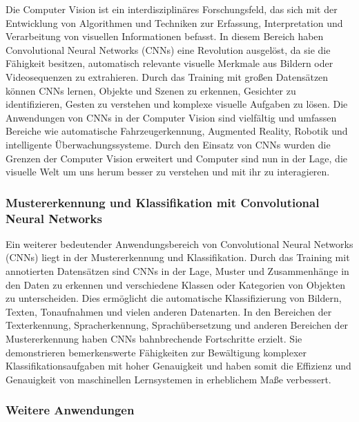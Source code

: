             Die Computer Vision ist ein interdisziplinäres Forschungsfeld, das sich mit der Entwicklung von Algorithmen und Techniken zur Erfassung, Interpretation und Verarbeitung von visuellen Informationen befasst. 
            In diesem Bereich haben Convolutional Neural Networks (CNNs) eine Revolution ausgelöst, da sie die Fähigkeit besitzen, automatisch relevante visuelle Merkmale aus Bildern oder Videosequenzen zu extrahieren. 
            Durch das Training mit großen Datensätzen können CNNs lernen, Objekte und Szenen zu erkennen, Gesichter zu identifizieren, Gesten zu verstehen und komplexe visuelle Aufgaben zu lösen. 
            Die Anwendungen von CNNs in der Computer Vision sind vielfältig und umfassen Bereiche wie automatische Fahrzeugerkennung, Augmented Reality, Robotik und intelligente Überwachungssysteme. 
            Durch den Einsatz von CNNs wurden die Grenzen der Computer Vision erweitert und Computer sind nun in der Lage, die visuelle Welt um uns herum besser zu verstehen und mit ihr zu interagieren.
        
        \subsubsection{Mustererkennung und Klassifikation mit Convolutional Neural Networks}
    
            Ein weiterer bedeutender Anwendungsbereich von Convolutional Neural Networks (CNNs) liegt in der Mustererkennung und Klassifikation. 
            Durch das Training mit annotierten Datensätzen sind CNNs in der Lage, Muster und Zusammenhänge in den Daten zu erkennen und verschiedene Klassen oder Kategorien von Objekten zu unterscheiden. 
            Dies ermöglicht die automatische Klassifizierung von Bildern, Texten, Tonaufnahmen und vielen anderen Datenarten. 
            In den Bereichen der Texterkennung, Spracherkennung, Sprachübersetzung und anderen Bereichen der Mustererkennung haben CNNs bahnbrechende Fortschritte erzielt. 
            Sie demonstrieren bemerkenswerte Fähigkeiten zur Bewältigung komplexer Klassifikationsaufgaben mit hoher Genauigkeit und haben somit die Effizienz und Genauigkeit von maschinellen Lernsystemen in erheblichem Maße verbessert.
            
        \subsubsection{Weitere Anwendungen}
    
